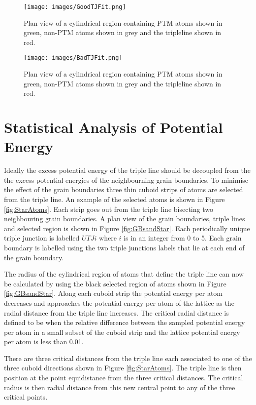 \documentclass[12pt,a4paper]{book}
\begin{document}
\begin{figure}
	\texttt{[image: images/GoodTJFit.png]} 
	\caption{Plan view of a cylindrical region containing PTM atoms shown in green, non-PTM atoms shown in grey and the tripleline shown in red.}
\end{figure}
\begin{figure}
	\texttt{[image: images/BadTJFit.png]} 
	\caption{Plan view of a cylindrical region containing PTM atoms shown in green, non-PTM atoms shown in grey and the tripleline shown in red.}
\end{figure}
\section{Statistical Analysis of Potential Energy}




Ideally the excess potential energy of the triple line should be decoupled from the the excess potential energies of the neighbourning grain boundaries. To minimise the effect of the grain boundaries three thin cuboid strips of atoms are selected from the triple line. An example of the selected atoms is shown in Figure \ref{fig:StarAtoms}. Each strip goes out from the triple line bisecting two neighbouring grain boundaries. A plan view of the grain boundaries, triple lines and selected region is shown in Figure \ref{fig:GBsandStar}. Each periodically unique triple junction is labelled $UTJi$ where $i$ is in an integer from 0 to 5. Each grain boundary is labelled using the two triple junctions labels that lie at each end of the grain boundary.

The radius of the cylindrical region of atoms that define the triple line can now be calculated by using the black selected region of atoms shown in Figure \ref{fig:GBsandStar}. Along each cuboid strip the potential energy per atom decreases and approaches the potential energy per atom of the lattice as the radial distance from the triple line increases. The critical radial distance is defined to be when the relative difference  between the sampled potential energy per atom in a small subset of the cuboid strip and the lattice potential energy per atom is less than 0.01. 

There are three critical distances from the triple line each associated to one of the three cuboid directions shown in Figure \ref{fig:StarAtoms}. The triple line is then position at the point equidistance from the three critical distances. The critical radius is then radial distance from this new central point to any of the three critical points.       
\end{document}
